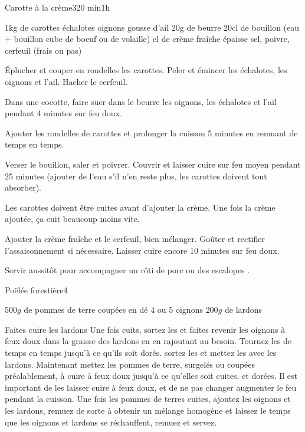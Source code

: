\begin{recette}{Carotte à la crème}{3}{20 min}{1h}
\begin{ingredients}
\ingredient 1kg de carottes
 échalotes
 oignons
 gousse d'ail
\ingredient 20g de beurre
\ingredient 20cl de bouillon (eau + bouillon cube de boeuf ou de volaille)
 cl de crème fraîche épaisse
\ingredient sel, poivre, cerfeuil (frais ou pas)
\end{ingredients}

\begin{preparation}
\etape Éplucher et couper en rondelles les carottes. Peler et émincer les échalotes, les oignons et l’ail. Hacher le cerfeuil.

\etape Dans une cocotte, faire suer dans le beurre les oignons, les échalotes et l’ail pendant 4 minutes sur feu doux.

\etape Ajouter les rondelles de carottes et prolonger la cuisson 5 minutes en remuant de temps en temps.

\etape Verser le bouillon, saler et poivrer. Couvrir et laisser cuire sur feu moyen pendant 25 minutes (ajouter de l'eau s'il n'en reste plus, les carottes doivent tout absorber).

\begin{remarque}
Les carottes doivent être cuites avant d'ajouter la crème. Une fois la crème ajoutée, ça cuit beaucoup moins vite.
\end{remarque}

\etape Ajouter la crème fraîche et le cerfeuil, bien mélanger. Goûter et rectifier l’assaisonnement si nécessaire. Laisser cuire encore 10 minutes sur feu doux.

\etape Servir aussitôt pour accompagner un rôti de porc ou des escalopes .
\end{preparation}

\end{recette}

\begin{recette}{Poëlée forestière}{4}{}{}
\begin{ingredients}
\ingredient $500\unit{g}$ de pommes de terre coupées en dé
\ingredient $4$ ou $5$ oignons
\ingredient $200\unit{g}$ de lardons
\end{ingredients}

\begin{preparation}
\etape Faites cuire les lardons
\etape Une fois cuits, sortez les et faites revenir les oignons à feux doux dans la graisse des lardons en en rajoutant au besoin. Tournez les de temps en temps jusqu'à ce qu'ils soit dorés.
\etape sortez les et mettez les avec les lardons. Maintenant mettez les pommes de terre, surgelés ou coupées préalablement, à cuire à feux doux jusqu'à ce qu'elles soit cuites, et dorées. Il est important de les laisser cuire à feux doux, et de ne pas changer augmenter le feu pendant la cuisson.
\etape Une fois les pommes de terres cuites, ajoutez les oignons et les lardons, remuez de sorte à obtenir un mélange homogène et laissez le temps que les oignons et lardons se réchauffent, remuez et servez.
\end{preparation}

\end{recette}

